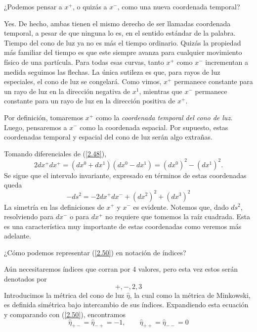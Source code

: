 \begin{pregunta}
    ¿Podemos pensar a $x^+$, o quizás a $x^-$, como una nueva coordenada temporal?
\end{pregunta}
Yes. De hecho, ambas tienen el mismo derecho de ser llamadas coordenada temporal, a pesar de que ninguna lo es, en el sentido estándar de la palabra. Tiempo del cono de luz ya no es más el tiempo ordinario. Quizás la propiedad más familiar del tiempo es que este siempre avanza para cualquier movimiento físico de una partícula. Para todas esas curvas, tanto $x^+$ como $x^-$ incrementan a medida seguimos las flechas. La única sutileza es que, para rayos de luz especiales, el cono de luz se congelará. Como vimos, $x^+$ permanece constante para un rayo de luz en la dirección negativa de $x^1$, mientras que $x^-$ permanece constante para un rayo de luz en la dirección positiva de $x^+$.

Por definición, tomaremos $x^+$ como la \textit{coordenada temporal del cono de luz}. Luego, pensaremos a $x^-$ como la coordenada espacial. Por supuesto, estas coordenadas temporal y espacial del cono de luz serán algo extrañas. 

Tomando diferenciales de (\ref{2.48}),
\begin{equation}
    2dx^+dx^+=(dx^0+dx^1)(dx^0-dx^1)=(dx^0)^2-(dx^1)^2.
\end{equation}
Se sigue que el intervalo invariante, expresado en términos de estas coordenadas queda
\begin{equation}\label{2.50}
    \boxed{-ds^2=-2dx^+dx^-+(dx^2)^2+(dx^3)^2}
\end{equation}
La simetría en las definiciones de $x^+$ y $x^-$ es evidente. Notemos que, dado $ds^2$, resolviendo para $dx^-$ o para $dx^+$ no requiere que tomemos la raíz cuadrada. Esta es una característica muy importante de estas coordenadas como veremos más adelante.

\begin{pregunta}
    ¿Cómo podemos representar (\ref{2.50}) en notación de índices?
\end{pregunta}
Aún necesitaremos índices que corran por 4 valores, pero esta vez estos serán denotados por
\begin{equation}
    +,-,2,3
\end{equation}
Introducimos la métrica del cono de luz $\hat{\eta}$, la cual como la métrica de Minkowski, es definida simétrica bajo intercambio de sus índices. Expandiendo esta ecuación y comparando con (\ref{2.50}), encontramos
\begin{equation}
    \hat{\eta}_{+-}=\hat{\eta}_{-+}=-1,\qquad \hat{\eta}_{++}=\hat{\eta}_{--}=0
\end{equation}

